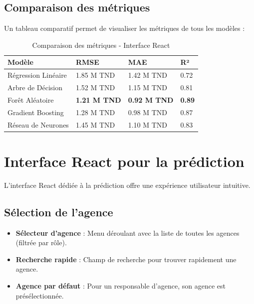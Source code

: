\subsection{Comparaison des métriques}

Un tableau comparatif permet de visualiser les métriques de tous les modèles :

\begin{table}[H]
\centering
\begin{tabular}{|p{3.5cm}|p{2.5cm}|p{2.5cm}|p{2.5cm}|}
\hline
\textbf{Modèle} & \textbf{RMSE} & \textbf{MAE} & \textbf{R²} \\
\hline
Régression Linéaire & 1.85 M TND & 1.42 M TND & 0.72 \\
\hline
Arbre de Décision & 1.52 M TND & 1.15 M TND & 0.81 \\
\hline
Forêt Aléatoire & \textbf{1.21 M TND} & \textbf{0.92 M TND} & \textbf{0.89} \\
\hline
Gradient Boosting & 1.28 M TND & 0.98 M TND & 0.87 \\
\hline
Réseau de Neurones & 1.45 M TND & 1.10 M TND & 0.83 \\
\hline
\end{tabular}
\caption{Comparaison des métriques - Interface React}
\label{tab:react-model-comparison}
\end{table}

\section{Interface React pour la prédiction}
\label{sec:sprint5-react-interface}

L'interface React dédiée à la prédiction offre une expérience utilisateur intuitive.

\subsection{Sélection de l'agence}

\begin{itemize}
    \item \textbf{Sélecteur d'agence} : Menu déroulant avec la liste de toutes les agences (filtrée par rôle).
    \item \textbf{Recherche rapide} : Champ de recherche pour trouver rapidement une agence.
    \item \textbf{Agence par défaut} : Pour un responsable d'agence, son agence est présélectionnée.
\end{itemize}

